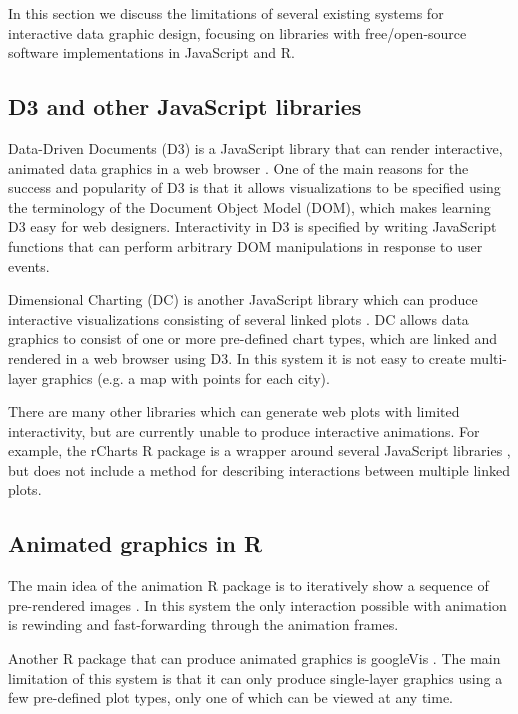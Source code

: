 \documentclass[12pt]{article}\usepackage[]{graphicx}\usepackage[]{color}
\begin{document}
In this section we discuss the limitations of several existing systems
for interactive data graphic design, focusing on libraries with
free/open-source software implementations in JavaScript and R.

\subsection{D3 and other JavaScript libraries}

Data-Driven Documents (D3) is a JavaScript library that can render
interactive, animated data graphics in a web browser \citep{d3}. One
of the main reasons for the success and popularity of D3 is that it
allows visualizations to be specified using the terminology of the
Document Object Model (DOM), which makes learning D3 easy for web
designers. Interactivity in D3 is specified by writing JavaScript
functions that can perform arbitrary DOM manipulations in response to
user events.

Dimensional Charting (DC) is another JavaScript library which can
produce interactive visualizations consisting of several linked plots
\citep{dc}. DC allows data graphics to consist of one or more
pre-defined chart types, which are linked and rendered in a web
browser using D3. In this system it is not easy to create multi-layer
graphics (e.g. a map with points for each city).

There are many other libraries which can generate web plots with
limited interactivity, but are currently unable to produce interactive
animations. For example, the rCharts R package is a wrapper around
several JavaScript libraries \citep{rcharts}, but does not include a
method for describing interactions between multiple linked
plots. 

\subsection{Animated graphics in R}

The main idea of the animation R package is to iteratively show a
sequence of pre-rendered images \citep{animation}. In this system the
only interaction possible with animation is rewinding and
fast-forwarding through the animation frames.

Another R package that can produce animated graphics is googleVis
\citep{googleVis}. The main limitation of this system is that it can
only produce single-layer graphics using a few pre-defined plot types,
only one of which can be viewed at any time.
\end{document}
